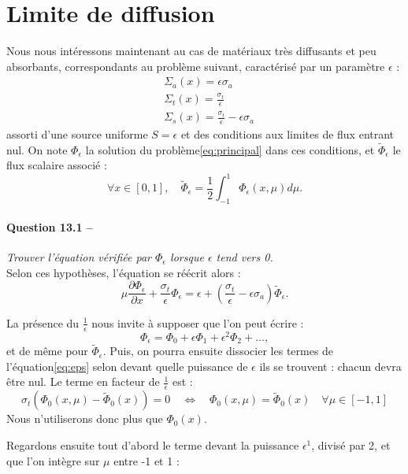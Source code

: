\documentclass[11pt,a4paper]{article}
\newcommand{\question}[2]{\paragraph{Question #1 --}\hspace{-7pt}\textit{#2} \\}
\newcommand{\Phit}{\widetilde{\Phi}}
\begin{document}
 \section{Limite de diffusion}
 
 Nous nous intéressons maintenant au cas de matériaux très diffusants et peu absorbants, correspondants au problème suivant, caractérisé par un paramètre $\epsilon$ :
  \begin{align}
   &\Sigma_a(x) = \epsilon \sigma_a\\
   &\Sigma_t(x) = \frac{\sigma_t}{\epsilon}\\
   &\Sigma_s(x) = \frac{\sigma_t}{\epsilon} - \epsilon \sigma_a
  \end{align}
 assorti d'une source uniforme $S = \epsilon$ et des conditions aux limites de flux entrant nul.
 On note $\Phi_\epsilon$ la solution du problème\ref{eq:principal} dans ces conditions, et $\Phit_\epsilon$ le flux scalaire associé :
 \begin{equation}
  \forall x\in [0,1], \quad \Phit_\epsilon = \frac{1}{2} \int_{-1}^1 \Phi_\epsilon(x,\mu) d\mu .
 \end{equation}
 
\question{13.1}{Trouver l'équation vérifiée par $\Phi_\epsilon$ lorsque $\epsilon$ tend vers 0.}

Selon ces hypothèses, l'équation se réécrit alors :
\begin{equation}
 \mu \frac{\partial \Phi_\epsilon}{\partial x} + \frac{\sigma_t}{\epsilon} \Phi_\epsilon =  \epsilon + \left(\frac{\sigma_t}{\epsilon} - \epsilon \sigma_a\right) \Phit_\epsilon .
 \label{eq:eps}
\end{equation}

La présence du $\frac{1}{\epsilon}$ nous invite à supposer que l'on peut écrire :
\begin{equation}
 \Phi_\epsilon = \Phi_0 + \epsilon\Phi_1 + \epsilon^2 \Phi_2 + ... ,
\end{equation}
et de même pour $\Phit_\epsilon$.
Puis, on pourra ensuite dissocier les termes de l'équation\ref{eq:eps} selon devant quelle puissance de $\epsilon$ ils se trouvent : chacun devra être nul.
Le terme en facteur de $\frac{1}{\epsilon}$ est :
\begin{equation}
 \sigma_t (\Phi_0(x,\mu) - \Phit_0(x)) = 0 \quad \Leftrightarrow \quad \Phi_0(x,\mu) = \Phit_0(x) \quad \forall \mu \in [-1,1]
\end{equation}
Nous n'utiliserons donc plus que $\Phi_0(x)$.

Regardons ensuite tout d'abord le terme devant la puissance $\epsilon^1$, divisé par 2, et que l'on intègre sur $\mu$ entre -1 et 1 :
\end{document}
